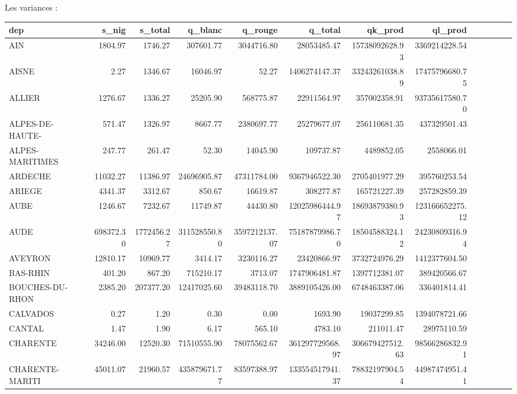\documentclass[11pt, a4paper]{article}
\begin{document}
\begin{landscape}
Les variances :
\FloatBarrier
\begin{tabular}{lrrrrrrrrrrrr}
    \hline
    dep & s\_nig & s\_total & q\_blanc & q\_rouge & q\_total & qk\_prod & ql\_prod \\ 
    \hline
    AIN & 1804.97 & 1746.27 & 307601.77 & 3044716.80 & 28053485.47 & 15738092628.93 & 3369214228.54 \\ 
    AISNE & 2.27 & 1346.67 & 16046.97 & 52.27 & 1406274147.37 & 33243261038.89 & 17475796680.75 \\ 
    ALLIER & 1276.67 & 1336.27 & 25205.90 & 568775.87 & 22911564.97 & 357002358.91 & 93735617580.70 \\ 
    ALPES-DE-HAUTE- & 571.47 & 1326.97 & 8667.77 & 2380697.77 & 25279677.07 & 256110681.35 & 437329501.43 \\ 
    ALPES-MARITIMES & 247.77 & 261.47 & 52.30 & 14045.90 & 109737.87 & 4489852.05 & 2558066.01 \\ 
    ARDECHE & 11032.27 & 11386.97 & 24696905.87 & 47311784.00 & 9367946522.30 & 2705401977.29 & 395760253.54 \\ 
    ARIEGE & 4341.37 & 3312.67 & 850.67 & 16619.87 & 308277.87 & 165721227.39 & 257282859.39 \\ 
    AUBE & 1246.67 & 7232.67 & 11749.87 & 44430.80 & 12025986444.97 & 18693879380.93 & 123166652275.12 \\ 
    AUDE & 698372.30 & 1772456.27 & 311528550.80 & 3597212137.07 & 75187879986.70 & 18504588324.12 & 24230809316.94 \\ 
    AVEYRON & 12810.17 & 10969.77 & 3414.17 & 3230116.27 & 23420866.97 & 3732724976.29 & 1412377604.50 \\ 
    BAS-RHIN & 401.20 & 867.20 & 715210.17 & 3713.07 & 1747906481.87 & 1397712381.07 & 389420566.67 \\ 
    BOUCHES-DU-RHON & 2385.20 & 207377.20 & 12417025.60 & 39483118.70 & 3889105426.00 & 6748463387.06 & 336401814.41 \\ 
    CALVADOS & 0.27 & 1.20 & 0.30 & 0.00 & 1693.90 & 19037299.85 & 1394078721.66 \\ 
    CANTAL & 1.47 & 1.90 & 6.17 & 565.10 & 4783.10 & 211011.47 & 28975110.59 \\ 
    CHARENTE & 34246.00 & 12520.30 & 71510555.90 & 78075562.67 & 361297729568.97 & 306679427512.63 & 98566286832.91 \\ 
    CHARENTE-MARITI & 45011.07 & 21960.57 & 435879671.77 & 83597388.97 & 133554517941.37 & 78832197904.54 & 44987474951.41 \\ 

\end{tabular}
\end{landscape}
\end{document}
